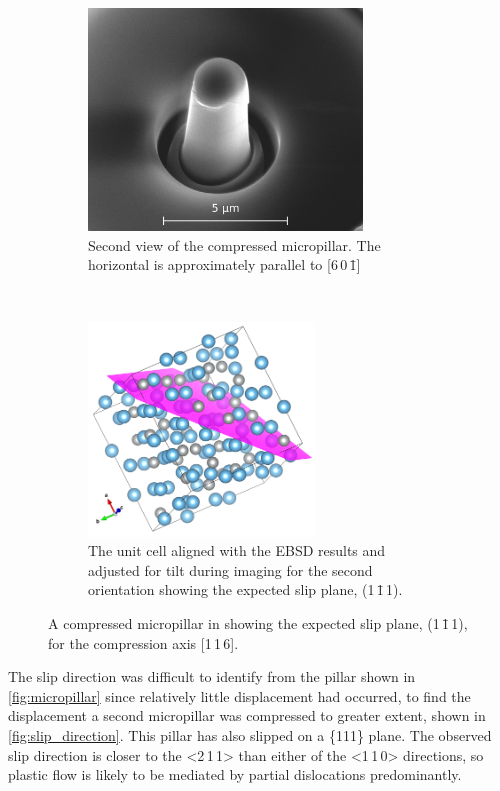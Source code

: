 \begin{figure}
\begin{subfigure}{0.45\textwidth}
\includegraphics[width=0.8\textwidth]{pillar_3_v2}
\caption{Second view of the compressed  micropillar. The horizontal is approximately parallel to [6\,0\,\={1}]}
\end{subfigure}
~
\begin{subfigure}{0.45\textwidth}
\centering
\includegraphics[width=0.66\textwidth]{Pillar_3_unit_cell_v2}
\caption{The unit cell aligned with the EBSD results and adjusted for tilt during imaging for the second orientation showing the expected slip plane, (1\,\={1}\,1).}
\end{subfigure}
\caption[A compressed micropillar of  showing the slip plane.]{A compressed micropillar in  showing the expected slip plane, (1\,\={1}\,1), for the compression axis [1\,1\,6].\label{fig:micropillar}}
\end{figure}

The slip direction was difficult to identify from the pillar shown in \autoref{fig:micropillar} since relatively little displacement had occurred, to find the displacement a second micropillar was compressed to greater extent, shown in \autoref{fig:slip_direction}. This pillar has also slipped on a \{111\} plane. The observed slip direction is closer to the <2\,1\,1> than either of the <1\,1\,0> directions, so plastic flow is likely to be mediated by partial dislocations predominantly.


